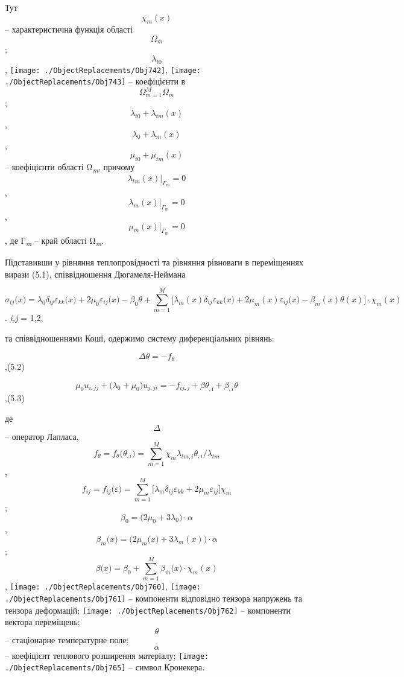 Тут \[{\chi_{m}(x)}{}\] -- характеристична функція області
\[\Omega_{m}{}\]; \[\lambda_{t0}{}\],
\texttt{[image: ./ObjectReplacements/Obj742]},
\texttt{[image: ./ObjectReplacements/Obj743]}
-- коефіцієнти в \[{\Omega{}_{m = 1}^{M}\Omega_{m}}{}\];
\[{{\lambda_{t0} + \lambda_{\mathit{\text{tm}}}}(x)}{}\],
\[{{\lambda_{0} + \lambda_{m}}(x)}{}\],
\[{{\mu_{t0} + \mu_{\mathit{\text{tm}}}}(x)}{}\] -- коефіцієнти області
Ω\textsubscript{\emph{m}}, причому
\[{\lambda_{\mathit{\text{tm}}}(x){|_{\Gamma_{m}} = 0}}{}\],
\[{\lambda_{m}(x){|_{\Gamma_{m}} = 0}}{}\],
\[{\mu_{m}(x){|_{\Gamma_{m}} = 0}}{}\], де Г\textsubscript{\emph{m}} --
край області Ω\textsubscript{\emph{m}}.

Підставивши у рівняння теплопровідності та рівняння рівноваги в
переміщеннях вирази (5.1), співвідношення Дюгамеля-Неймана

\[{\sigma_{\mathit{\text{ij}}}(x{) = \lambda_{0}}\delta_{\mathit{\text{ij}}}\varepsilon_{\mathit{\text{kk}}}(x{) + 2}\mu_{0}\varepsilon_{\mathit{\text{ij}}}(x{) - \beta_{0}}{\theta + {{\sum\limits_{m = 1}^{M}{\lbrack\lambda_{m}(x)\delta_{\mathit{\text{ij}}}\varepsilon_{\mathit{\text{kk}}}(x{) + 2}\mu_{m}(x)\varepsilon_{\mathit{\text{ij}}}(x{) - \beta_{m}}(x)\theta(x)\rbrack}} \cdot \chi_{m}}}(x)}{}\].
\emph{i,j} = 1,2,

та співвідношеннями Коші, одержимо систему диференціальних рівнянь:

\[{\mathit{\Delta\theta} = {- f_{\theta}}}{}\],(5.2)

\[{\mu_{0}{u_{i,\mathit{\text{jj}}} + (}{\lambda_{0} + \mu_{0}}){u_{j,\mathit{\text{ji}}} = {{- f_{\mathit{\text{ij}},j}} + \mathit{\text{βθ}_{\mathrm{,i}}} + \beta_{,i}}}\theta}{}\],(5.3)

де \[\Delta{}\] -- оператор Лапласа,
\[{{f_{\theta} = f_{\theta}}(\theta_{,i}{) = {\sum\limits_{m = 1}^{M}{\chi_{m}\lambda_{\mathit{\text{tm}},i}{\theta_{,i}/\lambda_{\mathit{\text{tm}}}}}}}}{}\],
\[{{f_{\mathit{\text{ij}}} = f_{\mathit{\text{ij}}}}(\varepsilon{) = {\sum\limits_{m = 1}^{M}{\lbrack\lambda_{m}\delta_{\mathit{\text{ij}}}{\varepsilon_{\mathit{\text{kk}}} + 2}\mu_{m}\varepsilon_{\mathit{\text{ij}}}\rbrack\chi_{m}}}}}{}\];
\[{{\beta_{0} = (}2{\mu_{0} + 3}\lambda_{0}{) \cdot \alpha}}{}\],
\[{\beta_{m}(x{) = (}2\mu_{m}(x{) + 3}\lambda_{m}(x){) \cdot \alpha}}{}\];
\[{\beta(x{) = {\beta_{0} + {\sum\limits_{m = 1}^{M}{\beta_{m}(x{) \cdot \chi_{m}}(x)}}}}}{}\],
\texttt{[image: ./ObjectReplacements/Obj760]},
\texttt{[image: ./ObjectReplacements/Obj761]}
-- компоненти відповідно тензора напружень та тензора деформацій;
\texttt{[image: ./ObjectReplacements/Obj762]}
-- компоненти вектора переміщень; \[\theta{}\] -- стаціонарне
температурне поле; \[\alpha{}\] -- коефіцієнт теплового розширення
матеріалу;
\texttt{[image: ./ObjectReplacements/Obj765]}
-- символ Кронекера.

